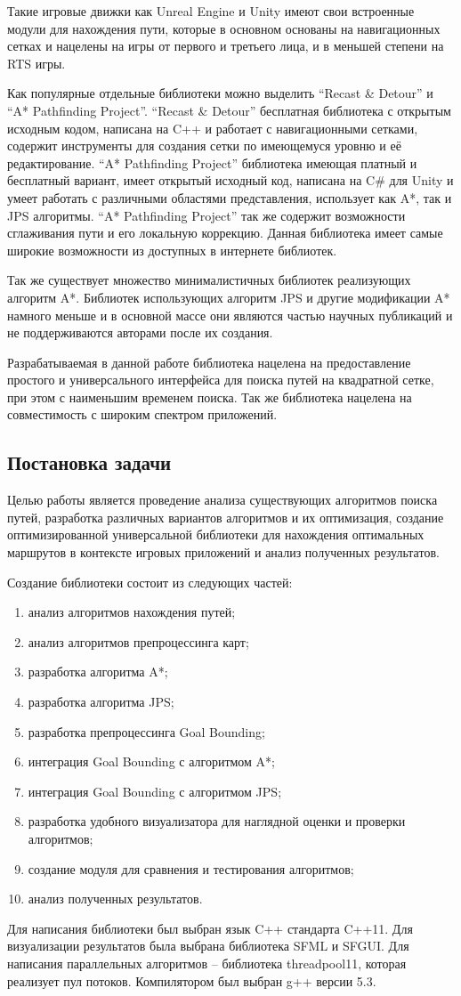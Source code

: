 Такие игровые движки как Unreal Engine и Unity имеют свои встроенные модули для нахождения пути, которые в основном основаны на навигационных сетках и нацелены на игры от первого и третьего лица, и в меньшей степени на RTS игры. 

Как популярные отдельные библиотеки можно выделить ``Recast \& Detour'' и ``A* Pathfinding Project''. ``Recast \& Detour'' бесплатная библиотека с открытым исходным кодом, написана на C++ и работает с навигационными сетками, содержит инструменты для создания сетки по имеющемуся уровню и её редактирование. ``A* Pathfinding Project'' библиотека имеющая платный и бесплатный вариант, имеет открытый исходный код, написана на C\# для Unity и умеет работать с различными областями представления, использует как A*, так и JPS алгоритмы. ``A* Pathfinding Project'' так же содержит возможности сглаживания пути и его локальную коррекцию. Данная библиотека имеет самые широкие возможности из доступных в интернете библиотек.

Так же существует множество минималистичных библиотек реализующих алгоритм A*. Библиотек использующих алгоритм JPS и другие модификации A* намного меньше и в основной массе они являются частью научных публикаций и не поддерживаются авторами после их создания. 
 
Разрабатываемая в данной работе библиотека нацелена на предоставление простого и универсального интерфейса для поиска путей на квадратной сетке, при этом с наименьшим временем поиска. Так же библиотека нацелена на совместимость с широким спектром приложений. 

\subsection{Постановка задачи}

Целью работы является проведение анализа существующих алгоритмов поиска путей, разработка различных вариантов алгоритмов и их оптимизация, создание оптимизированной универсальной библиотеки для нахождения оптимальных маршрутов в контексте игровых приложений и анализ полученных результатов. 

Создание библиотеки состоит из следующих частей:

\begin{enumerate}
    \item анализ алгоритмов нахождения путей;
    \item анализ алгоритмов препроцессинга карт;
    \item разработка алгоритма A*;
    \item разработка алгоритма JPS;
    \item разработка препроцессинга Goal Bounding;
    \item интеграция Goal Bounding с алгоритмом A*;
    \item интеграция Goal Bounding с алгоритмом JPS;
    \item разработка удобного визуализатора для наглядной оценки и проверки алгоритмов;
    \item создание модуля для сравнения и тестирования алгоритмов;
    \item анализ полученных результатов.
\end{enumerate}

Для написания библиотеки был выбран язык C++ стандарта C++11. Для визуализации результатов была выбрана библиотека SFML и SFGUI. Для написания параллельных алгоритмов -- библиотека threadpool11, которая реализует пул потоков. Компилятором был выбран g++ версии 5.3.